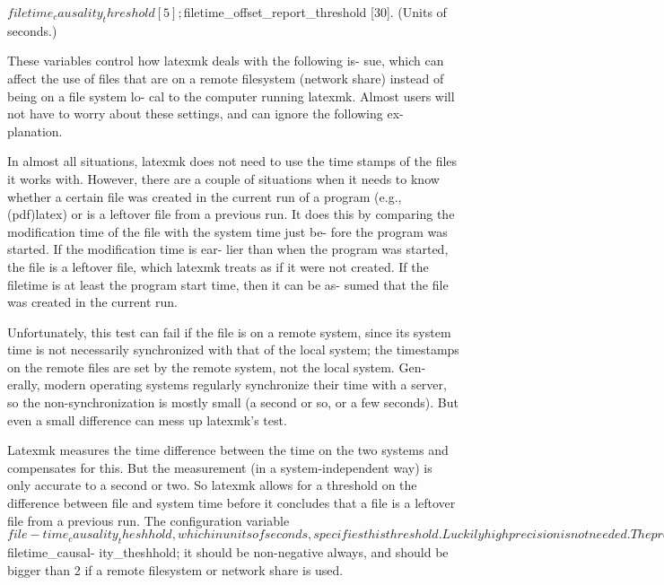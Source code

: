        $filetime_causality_threshold  [5];   $filetime_offset_report_threshold
       [30]. (Units of seconds.)

              These variables control how latexmk deals with the following is-
              sue, which can affect the use of files  that  are  on  a  remote
              filesystem (network share) instead of being on a file system lo-
              cal to the computer running latexmk.  Almost users will not have
              to  worry about these settings, and can ignore the following ex-
              planation.

              In almost all situations, latexmk does not need to use the  time
              stamps  of the files it works with.  However, there are a couple
              of situations when it needs to know whether a certain  file  was
              created in the current run of a program (e.g., (pdf)latex) or is
              a leftover file from a previous run. It does this  by  comparing
              the  modification time of the file with the system time just be-
              fore the program was started. If the modification time  is  ear-
              lier  than  when the program was started, the file is a leftover
              file, which latexmk treats as if it were not  created.   If  the
              filetime  is at least the program start time, then it can be as-
              sumed that the file was created in the current run.

              Unfortunately, this test can fail if the file  is  on  a  remote
              system,  since  its  system time is not necessarily synchronized
              with that of the local system;  the  timestamps  on  the  remote
              files  are set by the remote system, not the local system.  Gen-
              erally, modern operating  systems  regularly  synchronize  their
              time  with  a server, so the non-synchronization is mostly small
              (a second or so, or a few seconds).  But even a small difference
              can mess up latexmk's test.

              Latexmk measures the time difference between the time on the two
              systems and compensates for this.  But  the  measurement  (in  a
              system-independent way) is only accurate to a second or two.  So
              latexmk allows for a threshold on the  difference  between  file
              and  system  time  before it concludes that a file is a leftover
              file from a previous  run.  The  configuration  variable  $file-
              time_causality_theshhold,  which  in units of seconds, specifies
              this threshold.  Luckily high precision is not needed.  The pre-
              vious  run  is normally the previous run in a human run-edit-run
              cycle, and is at least many seconds  back.   A  few  seconds  is
              therefore   appropriate  for  the  threshold,  $filetime_causal-
              ity_theshhold; it should be non-negative always, and  should  be
              bigger than 2 if a remote filesystem or network share is used.

